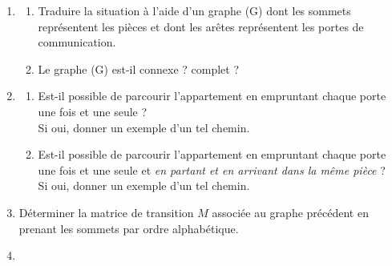 \begin{enumerate}
     \item %

     \begin{enumerate}[label=\alph*.]
          \item %
          Traduire la situation à l'aide d'un graphe (G) dont les sommets représentent les pièces et dont les arêtes représentent les portes de communication.
          \item %
          Le graphe (G) est-il connexe ? complet ?
     \end{enumerate}
     \par
     \item %
     \begin{enumerate}[label=\alph*.]
          \item %
          Est-il possible de parcourir l'appartement en empruntant chaque porte une fois et une seule ?\\
          Si oui, donner un exemple d'un tel chemin.
          \item %
          Est-il possible de parcourir l'appartement en empruntant chaque porte une fois et une seule et \textit{en partant et en arrivant dans la même pièce} ?\\
          Si oui, donner un exemple d'un tel chemin.
     \end{enumerate}
    
     \item %
     Déterminer la matrice de transition $M$ associée au graphe précédent en prenant les sommets par ordre alphabétique.
   
     \item %
    

\end{enumerate}
